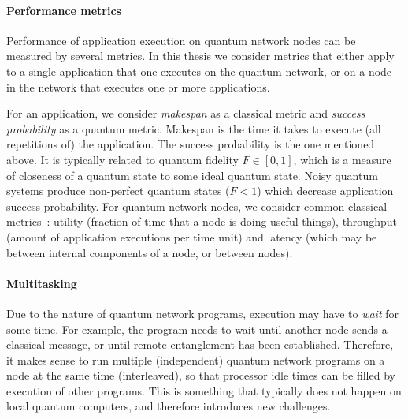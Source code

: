 \paragraph{Performance metrics}
Performance of application execution on quantum network nodes can be measured by several metrics.
In this thesis we consider metrics that either apply to a single application that one executes on the quantum network, or on a node in the network that executes one or more applications.

For an application, we consider \textit{makespan} as a classical metric and \textit{success probability} as a quantum metric.
Makespan is the time it takes to execute (all repetitions of) the application.
The success probability is the one mentioned above.
It is typically related to quantum fidelity $F \in [0, 1]$, which is a measure of closeness of a quantum state to some ideal quantum state.
Noisy quantum systems produce non-perfect quantum states ($F < 1$) which decrease application success probability.
For quantum network nodes, we consider common classical metrics~\cite{stankiewicz_commag}: utility (fraction of time that a node is doing useful things), throughput (amount of application executions per time unit) and latency (which may be between internal components of a node, or between nodes).


\paragraph{Multitasking}
Due to the nature of quantum network programs, execution may have to \textit{wait} for some time. For example, the program needs to wait until another node sends a classical message, or until remote entanglement has been established.
Therefore, it makes sense to run multiple (independent) quantum network programs on a node at the same time (interleaved), so that processor idle times can be filled by execution of other programs. This is something that typically does not happen on local quantum computers, and therefore introduces new challenges.


\begin{xstretch}
\printbibliography[heading=subbibintoc,title={References},notcategory=noprint]
\end{xstretch}
